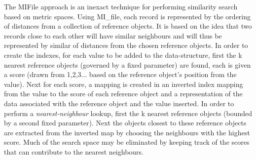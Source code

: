 \documentclass{llncs}
\begin{document}
The MIFile \cite{amato2014mi} approach is an inexact technique for performing similarity search based on metric spaces. Using  MI\_file,  each record is represented by the ordering of distances from a collection of reference objects.
It is based on the idea that two records close to each other will have similar neighbours and will thus be represented by similar of distances
from the chosen reference objects. 
In order to create the indexes, for each value to be added to the
data-structure, first the k nearest reference objects (governed by a fixed parameter) are found, each is given a score (drawn from 1,2,3... based on the reference object's position from the value).
Next for each score, a  mapping is created in an inverted index mapping
from the value to the score of each reference object and a representation of the data associated with the reference object and the value inserted.
In order to perform a \textit{nearest-neighbour} lookup, first the k nearest reference objects (bounded by a second fixed parameter).
Next the objects closest to these reference objects are extracted from the inverted map by choosing the neighbours with the highest score.
Much of the search space may be eliminated by  keeping track of the scores that  can contribute to the nearest neighbours.
\end{document}
